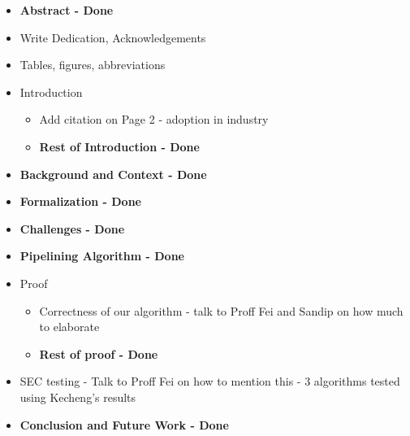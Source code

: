 \begin{itemize} 
  \item {\textbf {Abstract - Done}} 
  \item Write Dedication, Acknowledgements
  \item Tables, figures, abbreviations
  \item Introduction
  		\begin{itemize}
  		\item Add citation on Page 2 - adoption in industry
  		\item {\textbf {Rest of Introduction - Done}}
  		\end{itemize}
  \item {\textbf {Background and Context - Done}}
  \item {\textbf {Formalization - Done}}
  \item {\textbf {Challenges - Done}}
  \item {\textbf {Pipelining Algorithm - Done}}
  \item Proof
  		  \begin{itemize}
  		  \item Correctness of our algorithm - talk to Proff Fei and Sandip on how much to elaborate
  		  \item {\textbf {Rest of proof - Done}}
  		  \end{itemize}	
  \item SEC testing - Talk to Proff Fei on how to mention this - 3 algorithms tested using Kecheng's results
  \item {\textbf {Conclusion and Future Work - Done}}
\end{itemize}